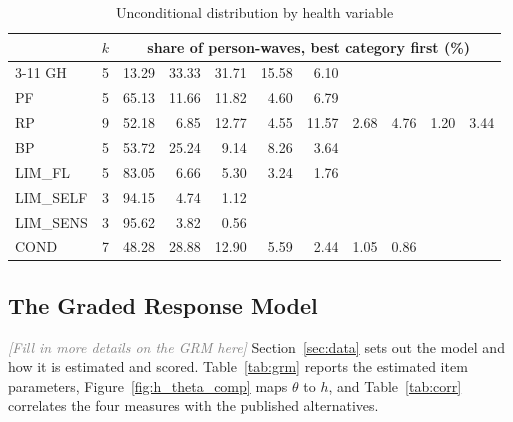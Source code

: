 \documentclass[11pt]{article}
\newcommand{\note}[1]{\textcolor{gray}{\textit{[#1]}}}
\begin{document}
	\begin{table}[H]
		\caption{Unconditional distribution by health variable}
		\label{tab:uncond_health_var}
		\centering
		\begin{tabular}{lr rrrrrrrrr}
			\toprule
			& $k$ & \multicolumn{9}{c}{share of person-waves, best category first (\%)} \\
			\cmidrule(l){3-11}
			GH & 5 & 13.29 & 33.33 & 31.71 & 15.58 & 6.10 & & & & \\
			PF & 5 & 65.13 & 11.66 & 11.82 & 4.60 & 6.79 & & & & \\
			RP & 9 & 52.18 & 6.85 & 12.77 & 4.55 & 11.57 & 2.68 & 4.76 & 1.20 & 3.44 \\
			BP & 5 & 53.72 & 25.24 & 9.14 & 8.26 & 3.64 & & & & \\
			LIM\_FL & 5 & 83.05 & 6.66 & 5.30 & 3.24 & 1.76 & & & & \\
			LIM\_SELF & 3 & 94.15 & 4.74 & 1.12 & & & & & & \\
			LIM\_SENS & 3 & 95.62 & 3.82 & 0.56 & & & & & & \\
			COND & 7 & 48.28 & 28.88 & 12.90 & 5.59 & 2.44 & 1.05 & 0.86 & & \\
			\bottomrule
		\end{tabular}
	\end{table}

	\subsection{The Graded Response Model} \label{app:grm_details}

	\note{Fill in more details on the GRM here}
	Section~\ref{sec:data} sets out the model and how it is estimated and scored. Table~\ref{tab:grm} reports the estimated item parameters, Figure~\ref{fig:h_theta_comp} maps $\theta$ to $h$, and Table~\ref{tab:corr} correlates the four measures with the published alternatives.
\end{document}
